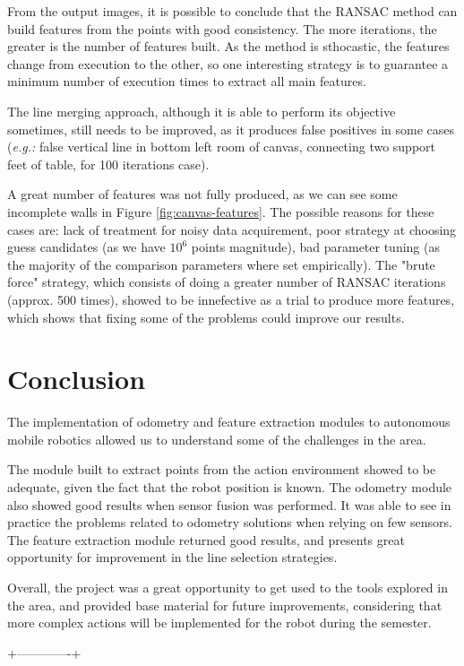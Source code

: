 \documentclass[twoside,conference,a4paper]{IEEEtran}
\begin{document}
From the output images, it is possible to conclude that the RANSAC method can build features from the points with good consistency. The more iterations, the greater is the number of features built. As the method is sthocastic, the features change from execution to the other, so one interesting strategy is to guarantee a minimum number of execution times to extract all main features.
\par The line merging approach, although it is able to perform its objective sometimes, still needs to be improved, as it produces false positives in some cases (\textit{e.g.: }false vertical line in bottom left room of canvas, connecting two support feet of table, for 100 iterations case). 
\par A great number of features was not fully produced, as we can see some incomplete walls in Figure \ref{fig:canvas-features}. The possible reasons for these cases are: lack of treatment for noisy data acquirement, poor strategy at choosing guess candidates (as we have $10^{6}$ points magnitude), bad parameter tuning (as the majority of the comparison parameters where set empirically). The "brute force" strategy, which consists of doing a greater number of RANSAC iterations (approx. 500 times), showed to be innefective as a trial to produce more features, which shows that fixing some of the problems could improve our results.

\section{Conclusion}
The implementation of odometry and feature extraction modules to autonomous mobile robotics allowed us to understand some of the challenges in the area. 
\par The module built to extract points from the action environment showed to be adequate, given the fact that the robot position is known. The odometry module also showed good results when sensor fusion was performed. It was able to see in practice the problems related to odometry solutions when relying on few sensors. The feature extraction module returned good results, and presents great opportunity for improvement in the line selection strategies.
\par Overall, the project was a great opportunity to get used to the tools explored in the area, and provided base material for future improvements, considering that more complex actions will be implemented for the robot during the semester.  

 +-------------+










\end{document}
